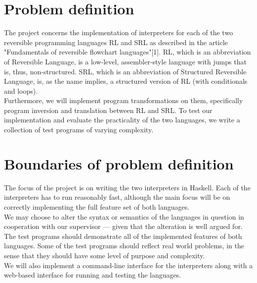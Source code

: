 \section{Problem definition}
\label{sec:problem_definition}
The project concerns the implementation of interpreters for each of the two reversible programming languages RL and SRL as described in the article "Fundamentals of reversible flowchart languages"[1]. RL, which is an abbreviation of Reversible Language, is a low-level, assembler-style language with jumps that is, thus, non-structured. SRL, which is an abbreviation of Structured Reversible Language, is, as the name implies, a structured version of RL (with conditionals and loops). \\
\indent Furthermore, we will implement program transformations on them, specifically program inversion and translation between RL and SRL. %
To test our implementation and evaluate the practicality of the two languages, we write a collection of test programs of varying complexity.

\section{Boundaries of problem definition}
\label{sec:boundaries_of_problem_definition}

The focus of the project is on writing the two interpreters in Haskell. Each of the interpreters has to run reasonably fast, although the main focus will be on correctly implementing the full feature set of both languages. \\
\indent We may choose to alter the syntax or semantics of the languages in question in cooperation with our supervisor --- given that the alteration is well argued for. \\
\indent The test programs should demonstrate all of the implemented features of both languages. Some of the test programs should reflect real world problems, in the sense that they should have some level of purpose and complexity. \\
\indent We will also implement a command-line interface for the interpreters along with a web-based interface for running and testing the languages.

